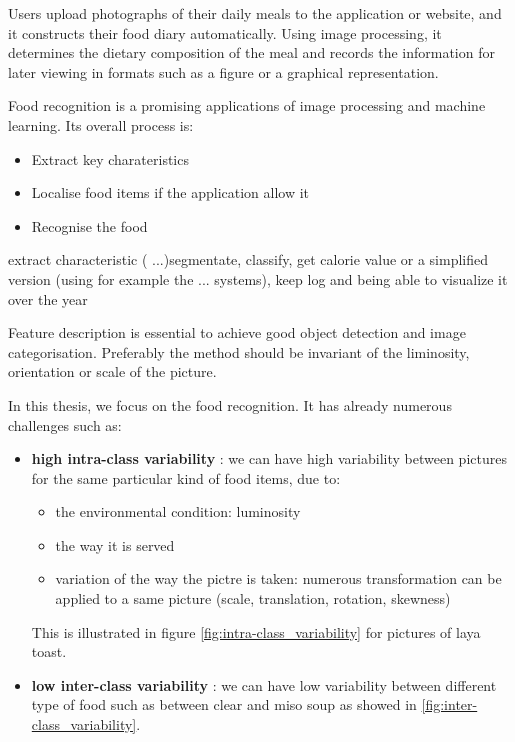 Users upload photographs of their daily meals to the application or website, and it constructs their food diary automatically. Using image processing, it determines the dietary composition of the meal and records the information for later viewing in formats such as a figure or a graphical representation.

Food recognition is a promising applications of image processing and machine learning. Its overall process is:
\begin{itemize}
    \item Extract key charateristics
    \item Localise food items if the application allow it
    \item Recognise the food
\end{itemize}

extract characteristic ( ...)segmentate, classify, get calorie value or a simplified version (using for example the ... systems), keep log and being able to visualize it over the year

Feature description is essential to achieve good object detection and image categorisation. Preferably the method should be invariant of the liminosity, orientation or scale of the picture.

In this thesis, we focus on the food recognition. It has already numerous challenges such as:
\begin{itemize}
    \item \textbf{high intra-class variability} : we can have high variability between pictures for the same particular kind of food items, due to:
    \begin{itemize}
        \item the environmental condition: luminosity
        \item the way it is served
        \item variation of the way the pictre is taken: numerous transformation can be applied to a same picture (scale, translation, rotation, skewness)
    \end{itemize}
    This is illustrated in figure \ref{fig:intra-class_variability} for pictures of laya toast.
    
    \item \textbf{low inter-class variability} : we can have low variability between different type of food such as between clear and miso soup as showed in \ref{fig:inter-class_variability}.
\end{itemize}


